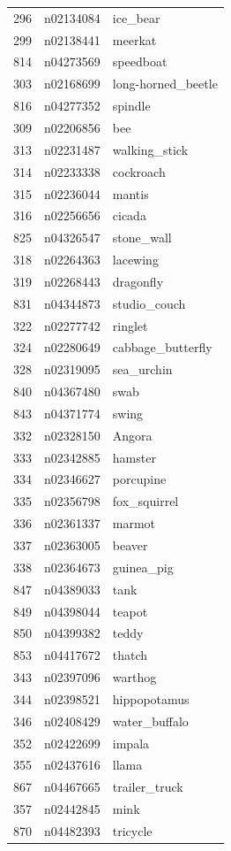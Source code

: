 \begin{table}
\begin{tabular}{cll}
296 & n02134084 & ice_bear \\
299 & n02138441 & meerkat \\
814 & n04273569 & speedboat \\
303 & n02168699 & long-horned_beetle \\
816 & n04277352 & spindle \\
309 & n02206856 & bee \\
313 & n02231487 & walking_stick \\
314 & n02233338 & cockroach \\
315 & n02236044 & mantis \\
316 & n02256656 & cicada \\
825 & n04326547 & stone_wall \\
318 & n02264363 & lacewing \\
319 & n02268443 & dragonfly \\
831 & n04344873 & studio_couch \\
322 & n02277742 & ringlet \\
324 & n02280649 & cabbage_butterfly \\
328 & n02319095 & sea_urchin \\
840 & n04367480 & swab \\
843 & n04371774 & swing \\
332 & n02328150 & Angora \\
333 & n02342885 & hamster \\
334 & n02346627 & porcupine \\
335 & n02356798 & fox_squirrel \\
336 & n02361337 & marmot \\
337 & n02363005 & beaver \\
338 & n02364673 & guinea_pig \\
847 & n04389033 & tank \\
849 & n04398044 & teapot \\
850 & n04399382 & teddy \\
853 & n04417672 & thatch \\
343 & n02397096 & warthog \\
344 & n02398521 & hippopotamus \\
346 & n02408429 & water_buffalo \\
352 & n02422699 & impala \\
355 & n02437616 & llama \\
867 & n04467665 & trailer_truck \\
357 & n02442845 & mink \\
870 & n04482393 & tricycle \\

\end{tabular}
\end{table}
